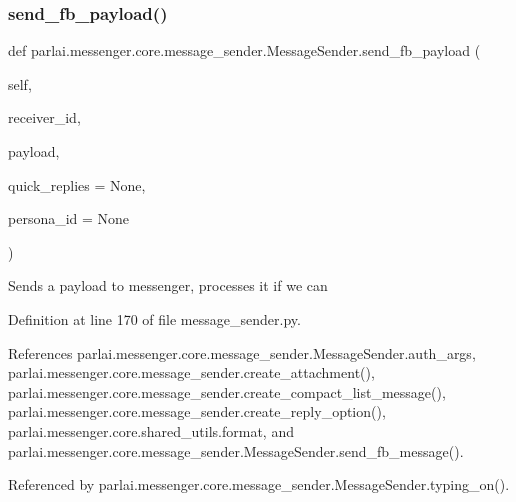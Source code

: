 \subsubsection{\texorpdfstring{send\+\_\+fb\+\_\+payload()}{send\_fb\_payload()}}
{\footnotesize\ttfamily def parlai.\+messenger.\+core.\+message\+\_\+sender.\+Message\+Sender.\+send\+\_\+fb\+\_\+payload (\begin{DoxyParamCaption}\item[{}]{self,  }\item[{}]{receiver\+\_\+id,  }\item[{}]{payload,  }\item[{}]{quick\+\_\+replies = {\ttfamily None},  }\item[{}]{persona\+\_\+id = {\ttfamily None} }\end{DoxyParamCaption})}

\begin{DoxyVerb}Sends a payload to messenger, processes it if we can\end{DoxyVerb}
 

Definition at line 170 of file message\+\_\+sender.\+py.



References parlai.\+messenger.\+core.\+message\+\_\+sender.\+Message\+Sender.\+auth\+\_\+args, parlai.\+messenger.\+core.\+message\+\_\+sender.\+create\+\_\+attachment(), parlai.\+messenger.\+core.\+message\+\_\+sender.\+create\+\_\+compact\+\_\+list\+\_\+message(), parlai.\+messenger.\+core.\+message\+\_\+sender.\+create\+\_\+reply\+\_\+option(), parlai.\+messenger.\+core.\+shared\+\_\+utils.\+format, and parlai.\+messenger.\+core.\+message\+\_\+sender.\+Message\+Sender.\+send\+\_\+fb\+\_\+message().



Referenced by parlai.\+messenger.\+core.\+message\+\_\+sender.\+Message\+Sender.\+typing\+\_\+on().

